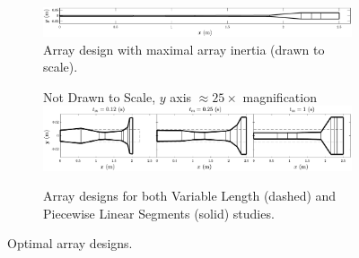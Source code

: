 \begin{figure}[t]

    \begin{subfigure}[b]{\textwidth}
      \centering
      \includegraphics[width=\columnwidth]{../ch7/figures/UnscaledArray.pdf}
      \caption{Array design with maximal array inertia (drawn to scale).\label{fig:ch7:array_scale}}
    \end{subfigure}

    \begin{subfigure}[b]{\textwidth}
      \centering
      \textsf{Not Drawn to Scale, $y$ axis $\approx 25 \times$ magnification}
      \includegraphics[width=\columnwidth]{../ch7/figures/ArraysPLS.pdf}
      \caption{Array designs for both Variable Length (dashed) and Piecewise Linear Segments (solid) studies.}\label{fig:ch7:arrays_pls}
    \end{subfigure}
    
   \caption{Optimal array designs.}
   
\end{figure}